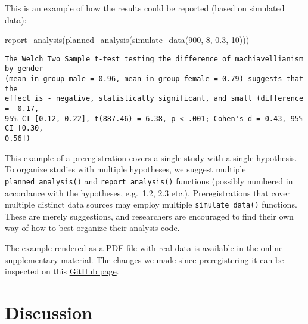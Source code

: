 \documentclass[psych,tutorial,submit,moreauthors,pdftex]{mdpi}
\newenvironment{Shaded}{\begin{snugshade}}{\end{snugshade}}
\newcommand{\DecValTok}[1]{\textcolor[rgb]{0.00,0.00,0.81}{#1}}
\newcommand{\FloatTok}[1]{\textcolor[rgb]{0.00,0.00,0.81}{#1}}
\newcommand{\FunctionTok}[1]{\textcolor[rgb]{0.00,0.00,0.00}{#1}}
\newcommand{\NormalTok}[1]{#1}
\begin{document}
This is an example of how the results could be reported (based on
simulated data):

\begin{Shaded}
\begin{Highlighting}[]
\FunctionTok{report\_analysis}\NormalTok{(}\FunctionTok{planned\_analysis}\NormalTok{(}\FunctionTok{simulate\_data}\NormalTok{(}\DecValTok{900}\NormalTok{, }\DecValTok{8}\NormalTok{, }\FloatTok{0.3}\NormalTok{, }\DecValTok{10}\NormalTok{)))}
\end{Highlighting}
\end{Shaded}

\begin{verbatim}
The Welch Two Sample t-test testing the difference of machiavellianism by gender
(mean in group male = 0.96, mean in group female = 0.79) suggests that the
effect is - negative, statistically significant, and small (difference = -0.17,
95% CI [0.12, 0.22], t(887.46) = 6.38, p < .001; Cohen's d = 0.43, 95% CI [0.30,
0.56])
\end{verbatim}

This example of a preregistration covers a single study with a single
hypothesis. To organize studies with multiple hypotheses, we suggest
multiple \texttt{planned\_analysis()} and \texttt{report\_analysis()}
functions (possibly numbered in accordance with the hypotheses,
e.g.~1.2, 2.3 etc.). Preregistrations that cover multiple distinct data
sources may employ multiple \texttt{simulate\_data()} functions. These
are merely suggestions, and researchers are encouraged to find their own
way of how to best organize their analysis code.

The example rendered as a
\href{https://github.com/aaronpeikert/repro-tutorial/files/7309455/preregistration.pdf}{PDF
file with real data} is available in the
\href{https://github.com/aaronpeikert/repro-tutorial/releases/tag/v0.0.3.1-results}{online
supplementary material}. The changes we made since preregistering it can
be inspected on this
\href{https://github.com/aaronpeikert/repro-tutorial/compare/v0.0.1.1-prereg..main\#diff-e21a8fa2e44b297dfefef329a6ef56d283488d467c4b4ffe2a014111e52a170b}{GitHub
page}.

\hypertarget{discussion}{%
\section{Discussion}\label{discussion}}
\end{document}
